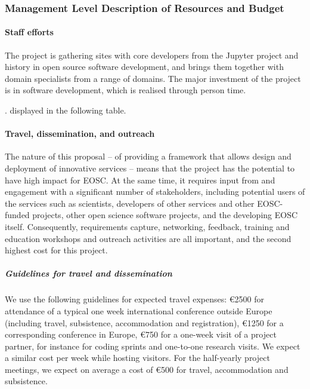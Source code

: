 \subsubsection{Management Level Description of Resources and Budget}
\label{sect:budget-details}

\paragraph{Staff efforts}


The \TheProject project is gathering sites with core
developers from the Jupyter project and history in open source
software development, and brings them together with domain specialists
from a range of domains. The major investment of the project is in
software development, which is realised through person time.

\ifgrantagreement.\else{} %
displayed in the following table.
\wpfig[label=fig:staffeffort,caption=Summary of Staff Efforts]
\fi

\paragraph{Travel, dissemination, and outreach}

The nature of this proposal -- of providing a framework that allows
design and deployment of innovative services -- means that the project
has the potential to have high impact for EOSC. At the same time, it
requires input from and engagement with a significant number of
stakeholders, including potential users of the services such as
scientists, developers of other services and other EOSC-funded
projects, other open science software projects, and the developing
EOSC itself. Consequently, requirements capture, networking, feedback,
training and education workshops and outreach activities are all
important, and the second highest cost for this project.

\subparagraph{Guidelines for travel and dissemination}
\label{sect:budget-details-travel}

We use the following guidelines for expected travel expenses:
\euro{2500} for attendance of a typical one week international
conference outside Europe (including travel, subsistence,
accommodation and registration), \euro{1250} for a corresponding
conference in Europe, \euro{750} for a one-week visit of a project
partner, for instance for coding sprints and one-to-one
research visits. We expect a similar cost per week while hosting
visitors. For the half-yearly project meetings, we expect on average a
cost of \euro{500} for travel, accommodation and subsistence.


